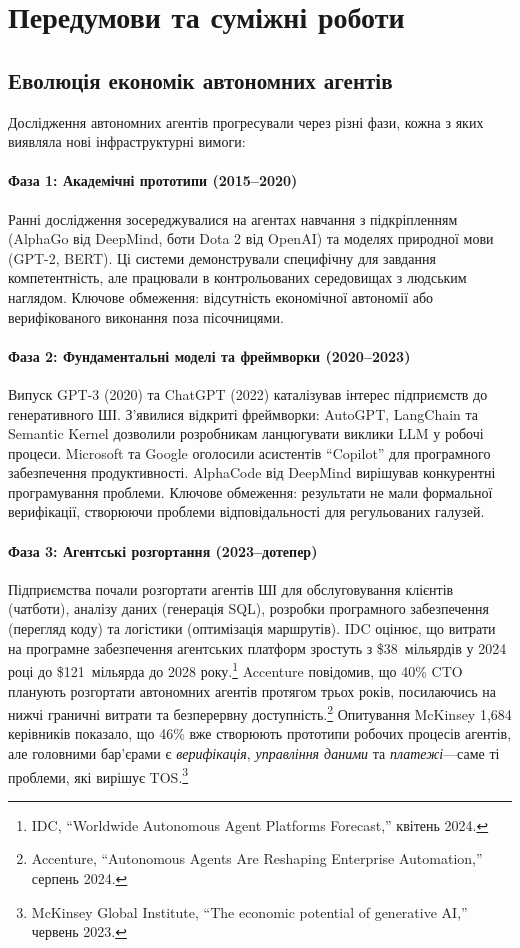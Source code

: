 \documentclass[11pt]{article}
\begin{document}
\section{Передумови та суміжні роботи}
\subsection{Еволюція економік автономних агентів}
Дослідження автономних агентів прогресували через різні фази, кожна з яких виявляла нові інфраструктурні вимоги:

\paragraph{Фаза 1: Академічні прототипи (2015--2020)} Ранні дослідження зосереджувалися на агентах навчання з підкріпленням (AlphaGo від DeepMind, боти Dota 2 від OpenAI) та моделях природної мови (GPT-2, BERT). Ці системи демонстрували специфічну для завдання компетентність, але працювали в контрольованих середовищах з людським наглядом. Ключове обмеження: відсутність економічної автономії або верифікованого виконання поза пісочницями.

\paragraph{Фаза 2: Фундаментальні моделі та фреймворки (2020--2023)} Випуск GPT-3 (2020) та ChatGPT (2022) каталізував інтерес підприємств до генеративного ШІ. З'явилися відкриті фреймворки: AutoGPT, LangChain та Semantic Kernel дозволили розробникам ланцюгувати виклики LLM у робочі процеси. Microsoft та Google оголосили асистентів ``Copilot'' для програмного забезпечення продуктивності. AlphaCode від DeepMind вирішував конкурентні програмування проблеми. Ключове обмеження: результати не мали формальної верифікації, створюючи проблеми відповідальності для регульованих галузей.

\paragraph{Фаза 3: Агентські розгортання (2023--дотепер)} Підприємства почали розгортати агентів ШІ для обслуговування клієнтів (чатботи), аналізу даних (генерація SQL), розробки програмного забезпечення (перегляд коду) та логістики (оптимізація маршрутів). IDC оцінює, що витрати на програмне забезпечення агентських платформ зростуть з \$38~мільярдів у 2024 році до \$121~мільярда до 2028 року.\footnote{IDC, ``Worldwide Autonomous Agent Platforms Forecast,'' квітень 2024.} Accenture повідомив, що 40\% CTO планують розгортати автономних агентів протягом трьох років, посилаючись на нижчі граничні витрати та безперервну доступність.\footnote{Accenture, ``Autonomous Agents Are Reshaping Enterprise Automation,'' серпень 2024.} Опитування McKinsey 1,684 керівників показало, що 46\% вже створюють прототипи робочих процесів агентів, але головними бар'єрами є \emph{верифікація}, \emph{управління даними} та \emph{платежі}---саме ті проблеми, які вирішує TOS.\footnote{McKinsey Global Institute, ``The economic potential of generative AI,'' червень 2023.}
\end{document}

